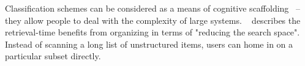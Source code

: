 Classification schemes can be considered as a means of cognitive scaffolding~\citep{jacob:01} -- they allow people to deal with the complexity of large systems. %
~\cite{ob:00} describes the retrieval-time benefits from organizing in terms of "reducing the search space". Instead of scanning a long list of unstructured items, users can home in on a particular subset directly.




